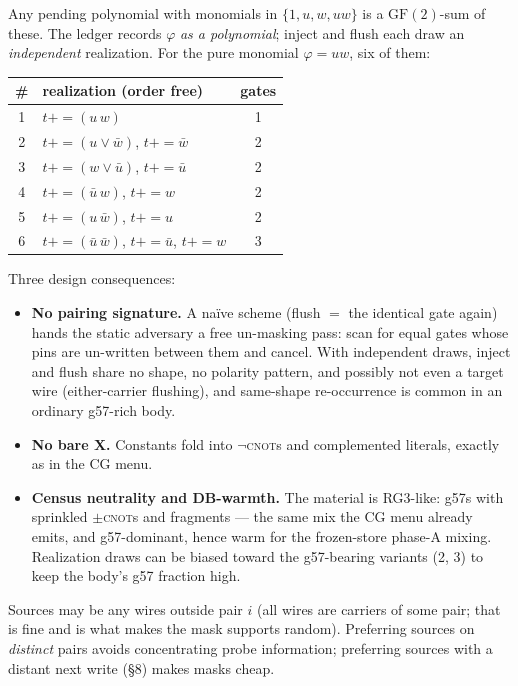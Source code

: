 \documentclass[11pt]{article}
\newcommand{\CNOT}{\textsc{cnot}}
\newcommand{\gf}{\mathrm{GF}(2)}
\newcommand{\pe}{\mathrel{{+}{=}}}    %
\begin{document}
Any pending polynomial with monomials in $\{1, u, w, uw\}$ is a $\gf$-sum
of these. The ledger records $\varphi$ \emph{as a polynomial}; inject and
flush each draw an \emph{independent} realization. For the pure monomial
$\varphi = uw$, six of them:

\begin{center}
\small
\begin{tabular}{clc}
\toprule
\# & realization (order free) & gates \\
\midrule
1 & $t \pe (u\,w)$ & 1 \\
2 & $t \pe (u \vee \bar w)$, \quad $t \pe \bar w$ & 2 \\
3 & $t \pe (w \vee \bar u)$, \quad $t \pe \bar u$ & 2 \\
4 & $t \pe (\bar u\, w)$, \quad $t \pe w$ & 2 \\
5 & $t \pe (u\, \bar w)$, \quad $t \pe u$ & 2 \\
6 & $t \pe (\bar u\, \bar w)$, $t \pe \bar u$, $t \pe w$ & 3 \\
\bottomrule
\end{tabular}
\end{center}

Three design consequences:
\begin{itemize}
\item \textbf{No pairing signature.} A na\"ive scheme (flush $=$ the
identical gate again) hands the static adversary a free un-masking pass:
scan for equal gates whose pins are un-written between them and cancel.
With independent draws, inject and flush share no shape, no polarity
pattern, and possibly not even a target wire (either-carrier flushing),
and same-shape re-occurrence is common in an ordinary g57-rich body.
\item \textbf{No bare X.} Constants fold into $\lnot$\CNOT{}s and
complemented literals, exactly as in the CG menu.
\item \textbf{Census neutrality and DB-warmth.} The material is
RG3-like: g57s with sprinkled $\pm$\CNOT{}s and fragments --- the same
mix the CG menu already emits, and g57-dominant, hence warm for the
frozen-store phase-A mixing. Realization draws can be biased toward the
g57-bearing variants (2, 3) to keep the body's g57 fraction high.
\end{itemize}

Sources may be any wires outside pair $i$ (all wires are carriers of some
pair; that is fine and is what makes the mask supports random). Preferring
sources on \emph{distinct} pairs avoids concentrating probe information;
preferring sources with a distant next write (\S8) makes masks cheap.
\end{document}
